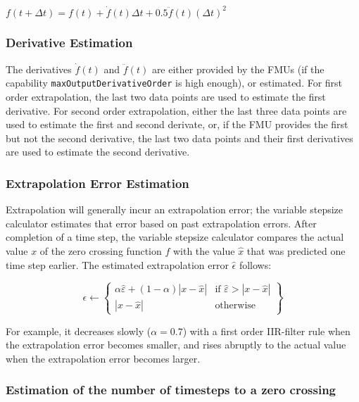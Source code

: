 $f(t+\Delta t) = f(t) + \dot{f}(t) \Delta t + 0.5 \ddot{f}(t) \left(\Delta t\right)^{2}$

\subsubsection{Derivative Estimation}\label{sec:derest}

The derivatives $\dot{f}(t)$ and $\ddot{f}(t)$ are either provided by the FMUs (if the capability \texttt{maxOutputDerivativeOrder} is high enough), or estimated. For first order extrapolation, the last two data points are used to estimate the first derivative. For second order extrapolation, either the last three data points are used to estimate the first and second derivate, or, if the FMU provides the first but not the second derivative, the last two data points and their first derivatives are used to estimate the second derivative.

\subsubsection{Extrapolation Error Estimation}

Extrapolation will generally incur an extrapolation error; the variable stepsize calculator estimates that error based on past extrapolation errors. After completion of a time step, the variable stepsize calculator compares the actual value $x$ of the zero crossing function $f$ with the value $\hat{x}$ that was predicted one time step earlier. The estimated extrapolation error $\hat{\epsilon}$ follows:

\begin{equation}
\epsilon \leftarrow \left\{
\begin{array}{ll}
	\alpha \hat{\varepsilon}+(1-\alpha) \left|x-\hat{x}\right| & \mbox{if $\hat{\varepsilon} > \left|x-\hat{x}\right|$}\\
	\left|x-\hat{x}\right| & \mbox{otherwise}
\end{array}\right\}
\end {equation}

\noindent For example, it decreases slowly ($\alpha=0.7$) with a first order IIR-filter rule when the extrapolation error becomes smaller, and rises abruptly to the actual value when the extrapolation error becomes larger.

\subsubsection{Estimation of the number of timesteps to a zero crossing}

